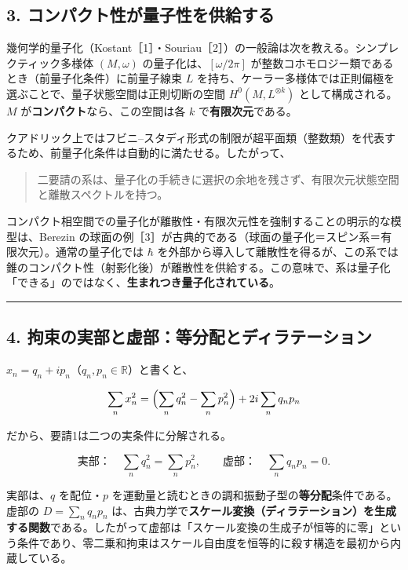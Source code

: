 \documentclass[
  a4paper,
]{ltjsarticle}
\begin{document}
\subsection{3.
コンパクト性が量子性を供給する}\label{ux30b3ux30f3ux30d1ux30afux30c8ux6027ux304cux91cfux5b50ux6027ux3092ux4f9bux7d66ux3059ux308b}

幾何学的量子化（Kostant［1］・Souriau［2］）の一般論は次を教える。シンプレクティック多様体
\((M,\omega)\) の量子化は、\([\omega/2\pi]\)
が整数コホモロジー類であるとき（前量子化条件）に前量子線束 \(L\)
を持ち、ケーラー多様体では正則偏極を選ぶことで、量子状態空間は正則切断の空間
\(H^0(M,L^{\otimes k})\) として構成される。\(M\)
が\textbf{コンパクト}なら、この空間は各 \(k\)
で\textbf{有限次元}である。

クアドリック上ではフビニ--スタディ形式の制限が超平面類（整数類）を代表するため、前量子化条件は自動的に満たせる。したがって、

\begin{quote}
二要請の系は、量子化の手続きに選択の余地を残さず、有限次元状態空間と離散スペクトルを持つ。
\end{quote}

コンパクト相空間での量子化が離散性・有限次元性を強制することの明示的な模型は、Berezin
の球面の例［3］が古典的である（球面の量子化＝スピン系＝有限次元）。通常の量子化では
\(\hbar\)
を外部から導入して離散性を得るが、この系では錐のコンパクト性（射影化後）が離散性を供給する。この意味で、系は量子化「できる」のではなく、\textbf{生まれつき量子化されている}。

\begin{center}\rule{0.5\linewidth}{0.5pt}\end{center}

\subsection{4.
拘束の実部と虚部：等分配とディラテーション}\label{ux62d8ux675fux306eux5b9fux90e8ux3068ux865aux90e8ux7b49ux5206ux914dux3068ux30c7ux30a3ux30e9ux30c6ux30fcux30b7ux30e7ux30f3}

\(x_n=q_n+ip_n\)（\(q_n,p_n\in\mathbb R\)）と書くと、

\[
\sum_n x_n^2=\Bigl(\sum_n q_n^2-\sum_n p_n^2\Bigr)+2i\sum_n q_np_n
\]

だから、要請1は二つの実条件に分解される。

\[
\text{実部：}\quad \sum_n q_n^2=\sum_n p_n^2,
\qquad
\text{虚部：}\quad \sum_n q_np_n=0.
\]

実部は、\(q\) を配位・\(p\)
を運動量と読むときの調和振動子型の\textbf{等分配}条件である。虚部の
\(D=\sum_n q_np_n\)
は、古典力学で\textbf{スケール変換（ディラテーション）を生成する関数}である。したがって虚部は「スケール変換の生成子が恒等的に零」という条件であり、零二乗和拘束はスケール自由度を恒等的に殺す構造を最初から内蔵している。
\end{document}
